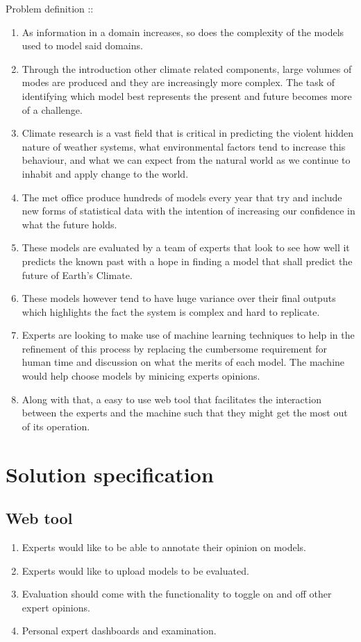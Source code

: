 \documentclass[11pt]{article} %
\numberwithin{equation}{section}
\begin{document}
Problem definition ::
\begin{enumerate}
\item As information in a domain increases, so does the complexity of the models used to model said domains.
\item Through the introduction other climate related components, large volumes of modes are produced and they are increasingly more complex. The task of identifying which model best represents the present and future becomes more of a challenge.
\item Climate research is a vast field that is critical in predicting the violent hidden nature of weather systems, what environmental factors tend to increase this behaviour, and what we can expect from the natural world as we continue to inhabit and apply change to the world.
\item The met office produce hundreds of models every year that try and include new forms of statistical data with the intention of increasing our confidence in what the future holds.
\item These models are evaluated by a team of experts that look to see how well it predicts the known past with a hope in finding a model that shall predict the future of Earth's Climate.
\item These models however tend to have huge variance over their final outputs which highlights the fact the system is complex and hard to replicate.
\item Experts are looking to make use of machine learning techniques to help in the refinement of this process by replacing the cumbersome requirement for human time and discussion on what the merits of each model. The machine would help choose models by minicing experts opinions.
\item Along with that, a easy to use web tool that facilitates the interaction between the experts and the machine such that they might get the most out of its operation.
\end{enumerate}


\section{Solution specification}

\subsection{Web tool}

\begin{enumerate}
\item Experts would like to be able to annotate their opinion on models.
\item Experts would like to upload models to be evaluated.
\item Evaluation should come with the functionality to toggle on and off other expert opinions.
\item Personal expert dashboards and examination.
\end{enumerate}
\end{document}
